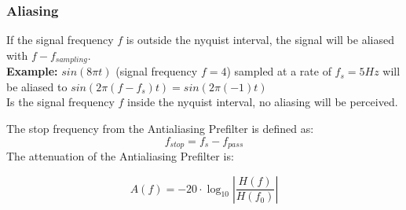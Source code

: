 \subsubsection{Aliasing}
If the signal frequency $f$ is outside the nyquist interval, the signal will be
aliased with $f - f_{sampling}$.\\
\textbf{Example:} $sin(8\pi t)$ (signal frequency $f=4$) sampled at a rate of
$f_s=5Hz$ will be aliased to $sin(2\pi (f-f_s) t) = sin(2\pi (-1) t)$\\

Is the signal frequency $f$ inside the nyquist interval, no aliasing will be
perceived.

The stop frequency from the Antialiasing Prefilter is defined as:
\[ f_{stop} = f_s - f_{pass} \]
The attenuation of the Antialiasing Prefilter is:

\[ A(f) = -20 \cdot \log_{10}{\left|\frac{H(f)}{H(f_0)}\right|} \]
